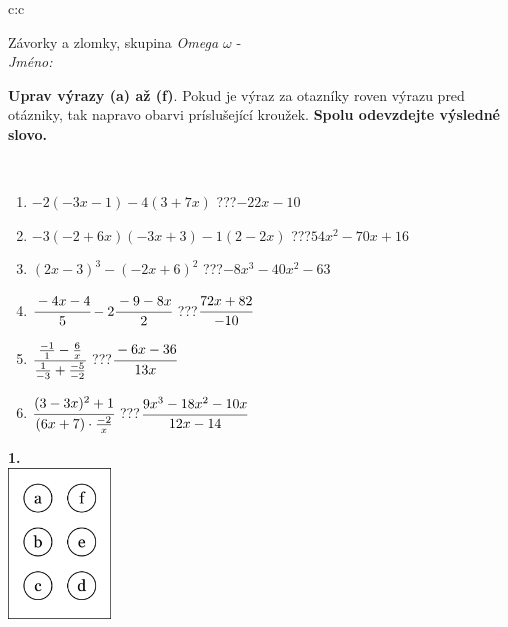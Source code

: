 \documentclass[10pt]{report}
\begin{document}
\begin{tabular}{c:c}
\begin{minipage}[c][104.5mm][t]{0.5\linewidth}
\begin{center}
\vspace{7mm}
{\huge Závorky a zlomky, skupina \textit{Omega $\omega$} -}\\[5mm]
\textit{Jméno:}\phantom{xxxxxxxxxxxxxxxxxxxxxxxxxxxxxxxxxxxxxxxxxxxxxxxxxxxxxxxxxxxxxxxxx}\\[5mm]
\begin{minipage}{0.95\linewidth}
\begin{center}
\textbf{Uprav výrazy (a) až (f)}. Pokud je výraz za otazníky roven výrazu pred otázniky, tak napravo obarvi príslušející kroužek. \textbf{Spolu odevzdejte výsledné slovo.}
\end{center}
\end{minipage}
\\[1mm]
\begin{minipage}{0.79\linewidth}
\begin{center}
\begin{varwidth}{\linewidth}
\begin{enumerate}
\normalsize
\item $-2(-3x-1)-4(3+7x)$\quad \dotfill\; ???\;\dotfill \quad $-22x-10$
\item $-3(-2+6x)(-3x+3)-1(2-2x)$\quad \dotfill\; ???\;\dotfill \quad $54x^2-70x+16$
\item $(2x-3)^3-(-2x+6)^2$\quad \dotfill\; ???\;\dotfill \quad $-8x^3-40x^2-63$
\item $\cfrac{-4x-4}{5}-2\cfrac{-9-8x}{2}$\quad \dotfill\; ???\;\dotfill \quad $\cfrac{72x+82}{-10}$
\item $\cfrac{\frac{-1}{1}-\frac{6}{x}}{\frac{1}{-3}+\frac{-5}{-2}}$\quad \dotfill\; ???\;\dotfill \quad $\cfrac{-6x-36}{13x}$
\item $\cfrac{(3-3x)^2+1}{(6x+7)\cdot\frac{-2}{x}}$\quad \dotfill\; ???\;\dotfill \quad $\cfrac{9x^3-18x^2-10x}{12x-14}$
\end{enumerate}
\end{varwidth}
\end{center}
\end{minipage}
\begin{minipage}{0.20\linewidth}
\begin{center}
{\Huge\bfseries 1.} \\[2mm]
\includegraphics[height=40mm]{../images/braille.png}

\end{center}
\end{minipage}
\end{center}
\end{minipage}
\end{tabular}
\end{document}
